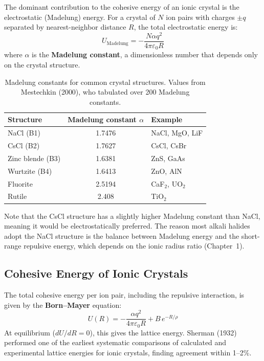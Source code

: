 The dominant contribution to the cohesive energy of an ionic crystal is the electrostatic (Madelung) energy. For a crystal of $N$ ion pairs with charges $\pm q$ separated by nearest-neighbor distance $R$, the total electrostatic energy is:
\begin{equation}
  U_{\text{Madelung}} = -\frac{N\alpha q^2}{4\pi\varepsilon_0 R}
\end{equation}
where $\alpha$ is the \textbf{Madelung constant}, a dimensionless number that depends only on the crystal structure.

\begin{table}[H]
\centering
\caption{Madelung constants for common crystal structures. Values from Mestechkin (2000), who tabulated over 200 Madelung constants.}
\label{tab:madelung}
\begin{tabular}{@{}lSl@{}}
\toprule
Structure & {Madelung constant $\alpha$} & Example \\
\midrule
NaCl (B1)           & 1.7476 & NaCl, MgO, LiF \\
CsCl (B2)           & 1.7627 & CsCl, CsBr \\
Zinc blende (B3)    & 1.6381 & ZnS, GaAs \\
Wurtzite (B4)       & 1.6413 & ZnO, AlN \\
Fluorite            & 2.5194 & CaF$_2$, UO$_2$ \\
Rutile              & 2.408  & TiO$_2$ \\
\bottomrule
\end{tabular}
\end{table}

Note that the CsCl structure has a slightly higher Madelung constant than NaCl, meaning it would be electrostatically preferred. The reason most alkali halides adopt the NaCl structure is the balance between Madelung energy and the short-range repulsive energy, which depends on the ionic radius ratio (Chapter~1).

\subsection{Cohesive Energy of Ionic Crystals}

The total cohesive energy per ion pair, including the repulsive interaction, is given by the \textbf{Born--Mayer} equation:
\begin{equation}
  U(R) = -\frac{\alpha q^2}{4\pi\varepsilon_0 R} + B\,e^{-R/\rho}
\end{equation}
At equilibrium ($dU/dR = 0$), this gives the lattice energy. Sherman (1932) performed one of the earliest systematic comparisons of calculated and experimental lattice energies for ionic crystals, finding agreement within 1--2\%.

